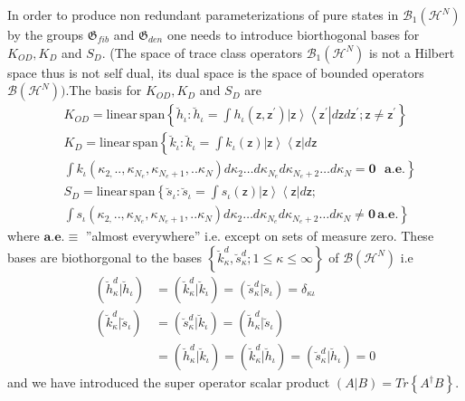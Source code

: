 \documentclass[aps,preprint]{revtex4}%
\begin{document}
In order to produce non redundant parameterizations of pure states in
$\mathcal{B}_{1}\left(  \mathcal{H}^{N}\right)  $ by the groups $\mathfrak{G}%
_{fib}$ and $\mathfrak{G}_{den}$ one needs to introduce biorthogonal bases for
$K_{OD},K_{D}$ and $S_{D}$. (The space of trace class operators $\mathcal{B}%
_{1}\left(  \mathcal{H}^{N}\right)  $ is not a Hilbert space thus is not self
dual, its dual space is the space of bounded operators $\mathcal{B}\left(
\mathcal{H}^{N}\right)  )$.The basis for $K_{OD},K_{D}$ and $S_{D}$ are
\begin{align}
&  K_{OD}=\mathrm{linear\,span}\left\{  \breve{h}_{\iota}:\breve{h}_{\iota
}=\int h_{\iota}\left(  \mathsf{z}\mathbf{,}\mathsf{z}^{\prime}\right)
\left|  \mathsf{z}\right\rangle \left\langle \mathsf{z}^{\prime}\right|
d\mathsf{z}d\mathsf{z}^{\prime};\mathsf{z}\mathbf{\neq}\mathsf{z}^{\prime
}\right\} \\
&  K_{D}=\mathrm{linear\,span}\left\{  \breve{k}_{\iota}:\breve{k}_{\iota
}=\int k_{\iota}\left(  \mathsf{z}\right)  \left|  \mathsf{z}\right\rangle
\left\langle \mathsf{z}\right|  d\mathsf{z}\right. \nonumber\\
&  \left.  \int k_{\iota}\left(  \kappa_{2,}..,\kappa_{N_{e}},\kappa_{N_{e}%
+1},..\kappa_{N}\right)  d\kappa_{2}\ldots d\kappa_{N_{e}}d\kappa_{N_{e}%
+2}\ldots d\kappa_{N}\mathbf{=0}\text{ }\mathbf{a.e.}\right\} \label{kbasis}\\
&  S_{D}=\mathrm{linear\,span}\left\{  \breve{s}_{\iota}:\breve{s}_{\iota
}=\int s_{\iota}\left(  \mathsf{z}\right)  \left|  \mathsf{z}\right\rangle
\left\langle \mathsf{z}\right|  d\mathsf{z}\right.  ;\nonumber\\
&  \left.  \int s_{\iota}\left(  \kappa_{2,}..,\kappa_{N_{e}},\kappa_{N_{e}%
+1},..\kappa_{N}\right)  d\kappa_{2}\ldots d\kappa_{N_{e}}d\kappa_{N_{e}%
+2}\ldots d\kappa_{N}\mathbf{\neq0\,a.e.}\right\}  \label{sbasis}%
\end{align}
where $\mathbf{a.e.\equiv}$ ''almost everywhere'' i.e. except on sets of
measure zero. These bases are biothorgonal to the bases $\left\{  \breve
{k}_{\kappa}^{d},\breve{s}_{\kappa}^{d};1\leq\kappa\leq\infty\right\}  $ of
$\mathcal{B}\left(  \mathcal{H}^{N}\right)  $ i.e
\begin{align}
\left(  \breve{h}_{\kappa}^{d}|\breve{h}_{\iota}\right)   &  =\left(
\breve{k}_{\kappa}^{d}|\breve{k}_{\iota}\right)  =\left(  \breve{s}_{\kappa
}^{d}|\breve{s}_{\iota}\right)  =\delta_{\kappa\iota}\nonumber\\
\left(  \breve{k}_{\kappa}^{d}|\breve{s}_{\iota}\right)   &  =\left(
\breve{s}_{\kappa}^{d}|\breve{k}_{\iota}\right)  =\left(  \breve{h}_{\kappa
}^{d}|\breve{s}_{\iota}\right) \nonumber\\
&  =\left(  \breve{h}_{\kappa}^{d}|\breve{k}_{\iota}\right)  =\left(
\breve{k}_{\kappa}^{d}|\breve{h}_{\iota}\right)  =\left(  \breve{s}_{\kappa
}^{d}|\breve{h}_{\iota}\right)  =0
\end{align}
and we have introduced the super operator scalar product $\left(  A|B\right)
=Tr\left\{  A^{\dagger}B\right\}  $.
\end{document}
